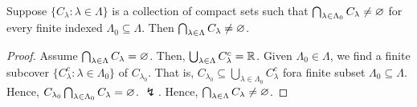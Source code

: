\begin{corollary}
	Suppose \(\{C_{\lambda} : \lambda \in \Lambda\} \) is a collection of compact sets such that \(\bigcap_{\lambda \in \Lambda_0} C_{\lambda} \neq \varnothing\) for every finite indexed \(\Lambda_0 \subseteq \Lambda\). Then \(\bigcap_{\lambda \in \Lambda} C_{\lambda} \neq \varnothing\).
\end{corollary}
\begin{proof}
	Assume \(\bigcap_{\lambda \in\Lambda} C_\lambda = \varnothing \). Then, \(\bigcup_{\lambda \in \Lambda} C_{\lambda}^{c} = \mathbb{R}\). Given \(\Lambda_0 \in \Lambda\), we find a finite subcover \(\{C_{\lambda}^{c} : \lambda \in \Lambda_0\} \) of \(C_{\lambda_0}\). That is, \(C_{\lambda_0}\subseteq \bigcup_{\lambda \in \Lambda_0} C_{\lambda}^{c}\) fora  finite subset \(\Lambda_0 \subseteq \Lambda\). Hence, \(C_{\lambda_0} \bigcap_{\lambda \in \Lambda_0}C_{\lambda} = \varnothing \). \(\lightning\). Hence, \(\bigcap_{\lambda \in \Lambda} C_{\lambda} \neq \varnothing\).
\end{proof}
